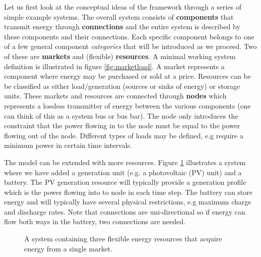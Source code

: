 \documentclass[]{report}
\renewcommand{\emph}{\textbf}
\begin{document}
Let us first look at the conceptual ideas of the framework through a series of simple example systems. The overall system consists of \emph{components} that transmit energy through \emph{connections} and the entire system is described by these components and their connections. Each specific component belongs to one of a few general component \textit{categories} that will be introduced as we proceed. Two of these are \emph{markets} and (flexible) \emph{resources}. A minimal working system definition is illustrated in figure \ref{fig:marketload}. A market represents a component where energy may be purchased or sold at a price. Resources can be be classified as either load/generation (sources or sinks of energy) or storage units. These markets and resources are connected through \emph{nodes} which represents a lossless transmitter of energy between the various components (one can think of this as a system bus or bus bar). The node only introduces the constraint that the power flowing in to the node must be equal to the power flowing out of the node. Different types of loads may be defined, e.g require a minimum power in certain time intervals.

The model can be extended with more resources. Figure \ref{fig:marketloadbatterygen} illustrates a system where we have added a generation unit (e.g. a photovoltaic (PV) unit) and a battery. The PV generation resource will typically provide a generation profile which is the power flowing into to node in each time step. The battery can store energy and will typically have several physical restrictions, e.g maximum charge and discharge rates. Note that connections are uni-directional so if energy can flow both ways in the battery, two connections are needed.

\begin{figure}
    \centering
    \caption{A system containing three flexible energy resources that acquire energy from a single market.}
    \label{fig:marketloadbatterygen}
\end{figure}
\end{document}
